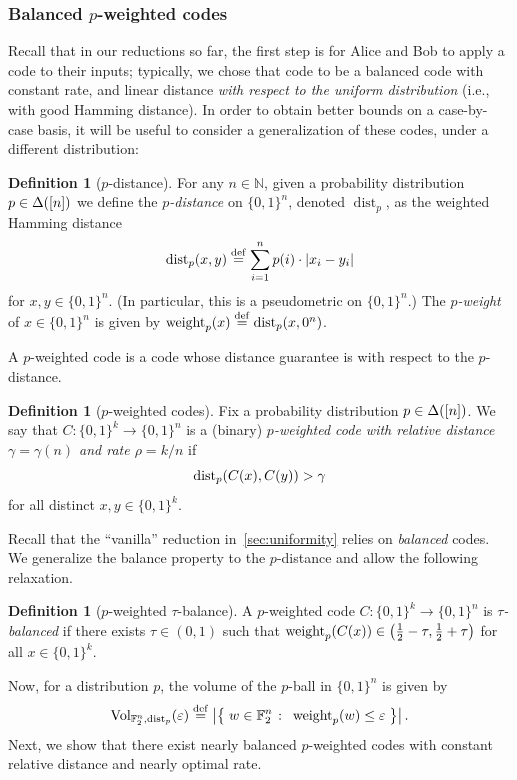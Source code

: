 \documentclass[11pt]{article}
\theoremstyle{remark}   	\newtheorem{remark}[theorem]{Remark}
\theoremstyle{definition}   	\newaliascnt{defn}{theorem}
\newtheorem{definition}[defn]{Definition}
\newcommand{\eps}{\ensuremath{\varepsilon}\xspace}
\newcommand{\setOfSuchThat}[2]{ \left\{\; #1 \;\colon\; #2\; \right\} } 			\newcommand{\indicSet}[1]{\mathds{1}_{#1}}                                              \newcommand{\indic}[1]{\indicSet{\left\{#1\right\}}}                                             \newcommand{\disjunion}{\amalg}
\newcommand{\abs}[1]{\left\lvert #1 \right\rvert}
\newcommand{\N}{\ensuremath{\mathbb{N}}\xspace}
\newcommand{\bitset}{\ensuremath{\{0,1\}}}
\newcommand{\pdistfunc}[1][p]{\operatorname{dist}_{#1}}
\newcommand{\pweightfunc}[1][p]{\operatorname{weight}_{#1}}
\newcommand{\pdist}[3][p]{\pdistfunc[#1]\mleft({#2, #3}\mright)}
\newcommand{\pweight}[2][p]{\pweightfunc[#1]\mleft({#2}\mright)}
\begin{document}
\subsubsection{Balanced $p$-weighted codes}
Recall that in our reductions so far, the first step is for Alice and Bob to apply a code to their inputs; typically, we chose that code to be a balanced code with constant rate, and linear distance \emph{with respect to the uniform distribution} (i.e., with good Hamming distance). In order to obtain better bounds on a case-by-case basis, it will be useful to consider a generalization of these codes, under a different distribution:
\begin{definition}[$p$-distance]
For any $n\in\N$, given a probability distribution $p\in\Delta\!\left([n]\right)$ we define the \emph{$p$-distance} on $\bitset^n$, denoted $\pdistfunc[p]$, as the weighted Hamming distance
\[
    \pdist[p]{x}{y} \eqdef \sum_{i=1}^{n} p(i)\cdot\abs{ x_i - y_i }
\]
for $x,y\in\bitset^n$. (In particular, this is a pseudometric on $\bitset^n$.) The \emph{$p$-weight} of $x\in\bitset^n$ is given by $\pweight[p]{x} \eqdef \pdist[p]{x}{0^n}$.
\end{definition}

A $p$-weighted code is a code whose distance guarantee is with respect to the $p$-distance. 
\begin{definition}[$p$-weighted codes]
Fix a probability distribution $p\in\Delta\!\left([n]\right)$. We say that $C\colon\bitset^k\to\bitset^n$ is a (binary) \emph{$p$-weighted code with relative distance $\gamma=\gamma(n)$ and rate $\rho = k/n$} if \[\pdist[p]{C(x)}{C(y)} > \gamma\] for all distinct $x,y\in \bitset^k$.
\end{definition}

Recall that the ``vanilla'' reduction in~\autoref{sec:uniformity} relies on \emph{balanced} codes. We generalize the balance property to the $p$-distance and allow the following relaxation.
\begin{definition}[$p$-weighted $\tau$-balance]
	A $p$-weighted code $C\colon\bitset^k\to\bitset^n$ is \emph{$\tau$-balanced} if there exists $\tau \in(0,1)$ such that $\pweight[p]{C(x)}\in\left(\frac{1}{2} -\tau, \frac{1}{2}+\tau\right)$ for all $x\in\bitset^k$.
\end{definition}
Now, for a distribution $p$, the volume of the $p$-ball in $\bitset^n$ is given by
\[
 \operatorname{Vol}_{\mathbb{F}_2^n,\pdistfunc[p]}(\eps) 
    \eqdef \abs{ \setOfSuchThat{w\in \mathbb{F}_2^n }{ \pweight[p]{w} \leq \eps } }.
\]
Next, we show that there exist nearly balanced $p$-weighted codes with constant relative distance and nearly optimal rate.
 
\end{document}
